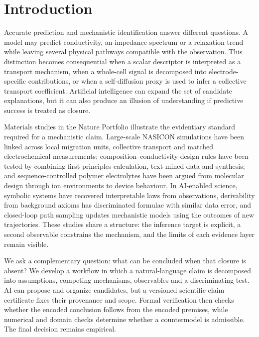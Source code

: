 \documentclass[pdflatex,sn-nature]{sn-jnl}
\begin{document}
\section{Introduction}

Accurate prediction and mechanistic identification answer different questions. A model may predict conductivity, an impedance spectrum or a relaxation trend while leaving several physical pathways compatible with the observation. This distinction becomes consequential when a scalar descriptor is interpreted as a transport mechanism, when a whole-cell signal is decomposed into electrode-specific contributions, or when a self-diffusion proxy is used to infer a collective transport coefficient. Artificial intelligence can expand the set of candidate explanations, but it can also produce an illusion of understanding if predictive success is treated as closure\cite{Krenn2022,Messeri2024}.

Materials studies in the Nature Portfolio illustrate the evidentiary standard required for a mechanistic claim. Large-scale NASICON simulations have been linked across local migration units, collective transport and matched electrochemical measurements\cite{Deng2022}; composition--conductivity design rules have been tested by combining first-principles calculation, text-mined data and synthesis\cite{WangNASICON2023}; and sequence-controlled polymer electrolytes have been argued from molecular design through ion environments to device behaviour\cite{Han2023}. In AI-enabled science, symbolic systems have recovered interpretable laws from observations\cite{Schmidt2009}, derivability from background axioms has discriminated formulae with similar data error\cite{Cornelio2023}, and closed-loop path sampling updates mechanistic models using the outcomes of new trajectories\cite{Jung2023}. These studies share a structure: the inference target is explicit, a second observable constrains the mechanism, and the limits of each evidence layer remain visible.

We ask a complementary question: what can be concluded when that closure is absent? We develop a workflow in which a natural-language claim is decomposed into assumptions, competing mechanisms, observables and a discriminating test. AI can propose and organize candidates, but a versioned scientific-claim certificate fixes their provenance and scope. Formal verification then checks whether the encoded conclusion follows from the encoded premises, while numerical and domain checks determine whether a countermodel is admissible. The final decision remains empirical.
\end{document}
